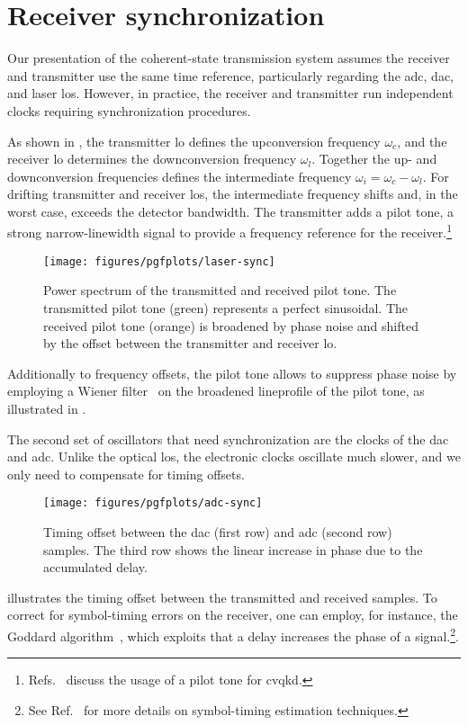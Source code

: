 \chapter{Receiver synchronization}\label{app:synchronization}

Our presentation of the coherent-state transmission system assumes the receiver and transmitter use the same time reference, particularly regarding the \gls{adc}, \gls{dac}, and laser \glspl{lo}.
However, in practice, the receiver and transmitter run independent clocks requiring synchronization procedures.

As shown in , the transmitter \gls{lo} defines the upconversion frequency $\omega_c$, and the receiver \gls{lo} determines the downconversion frequency $\omega_l$.
Together the up- and downconversion frequencies defines the intermediate frequency $\omega_i=\omega_c-\omega_l$.
For drifting transmitter and receiver \glspl{lo}, the intermediate frequency shifts and, in the worst case, exceeds the detector bandwidth.
The transmitter adds a pilot tone, a strong narrow-linewidth signal to provide a frequency reference for the receiver.\footnote{Refs.~\cite{Huang2015,Qi2015,Soh2015} discuss the usage of a pilot tone for \gls{cvqkd}.}
\begin{figure}[ht]
	\centering
	\texttt{[image: figures/pgfplots/laser-sync]}
	\caption{Power spectrum of the transmitted and received pilot tone. The transmitted pilot tone (green) represents a perfect sinusoidal. The received pilot tone (orange) is broadened by phase noise and shifted by the offset between the transmitter and receiver \gls{lo}.}\label{fig:pilot_tones}
\end{figure}
Additionally to frequency offsets, the pilot tone allows to suppress phase noise by employing a Wiener filter~\cite{Chen2006} on the broadened lineprofile of the pilot tone, as illustrated in .

The second set of oscillators that need synchronization are the clocks of the \gls{dac} and \gls{adc}.
Unlike the optical \gls{lo}s, the electronic clocks oscillate much slower, and we only need to compensate for timing offsets.
\begin{figure}[htb]
	\centering
	\texttt{[image: figures/pgfplots/adc-sync]}
	\caption{Timing offset between the \gls{dac} (first row) and \gls{adc} (second row) samples. The third row shows the linear increase in phase due to the accumulated delay.}\label{fig:adc_sync}
\end{figure}
 illustrates the timing offset between the transmitted and received samples.
To correct for symbol-timing errors on the receiver, one can employ, for instance, the Goddard algorithm~\cite{Godard1978}, which exploits that a delay increases the phase of a signal.\footnote{See Ref.~\cite[p.~359]{Proakis2007} for more details on symbol-timing estimation techniques.}.

